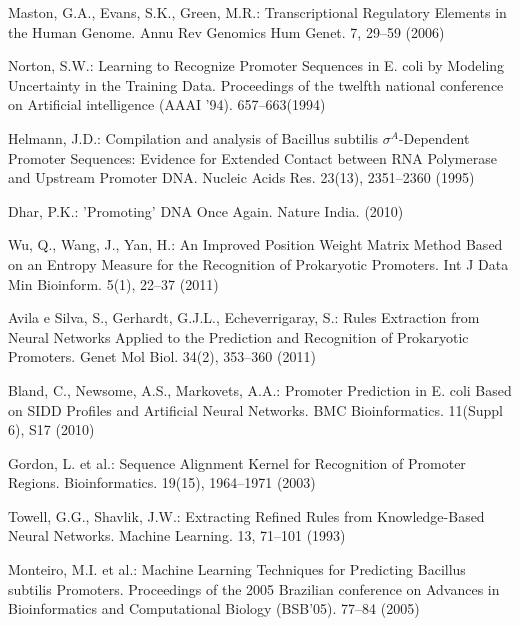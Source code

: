 \documentclass[runningheads,a4paper]{llncs}
\begin{document}
\begin{thebibliography}{4}

 Maston, G.A., Evans, S.K., Green, M.R.: Transcriptional Regulatory Elements in the Human Genome. Annu Rev Genomics Hum Genet. 7, 29--59 (2006)

 Norton, S.W.: Learning to Recognize Promoter Sequences in E. coli by Modeling Uncertainty in the Training Data. Proceedings of the twelfth national conference on Artificial intelligence (AAAI '94). 657--663(1994)

 Helmann, J.D.: Compilation and analysis of Bacillus subtilis ${\sigma }^{{A}}$-Dependent Promoter Sequences: Evidence for Extended Contact between RNA Polymerase and Upstream Promoter DNA. Nucleic Acids Res. 23(13), 2351--2360 (1995)

 Dhar, P.K.: 'Promoting' DNA Once Again. Nature India. (2010)

 Wu, Q., Wang, J., Yan, H.: An Improved Position Weight Matrix Method Based on an Entropy Measure for the Recognition of Prokaryotic Promoters. Int J Data Min Bioinform. 5(1), 22--37 (2011)

 Avila e Silva, S., Gerhardt, G.J.L., Echeverrigaray, S.: Rules Extraction from Neural Networks Applied to the Prediction and Recognition of Prokaryotic Promoters. Genet Mol Biol. 34(2), 353--360 (2011)

 Bland, C., Newsome, A.S., Markovets, A.A.: Promoter Prediction in E. coli Based on SIDD Profiles and Artificial Neural Networks. BMC Bioinformatics. 11(Suppl 6), S17 (2010)

 Gordon, L. et al.: Sequence Alignment Kernel for Recognition of Promoter Regions. Bioinformatics. 19(15), 1964--1971 (2003)

 Towell, G.G., Shavlik, J.W.: Extracting Refined Rules from Knowledge-Based Neural Networks. Machine Learning. 13, 71--101 (1993)

 Monteiro, M.I. et al.: Machine Learning Techniques for Predicting Bacillus subtilis Promoters. Proceedings of the 2005 Brazilian conference on Advances in Bioinformatics and Computational Biology (BSB'05). 77--84 (2005)


\end{thebibliography}
\end{document}
